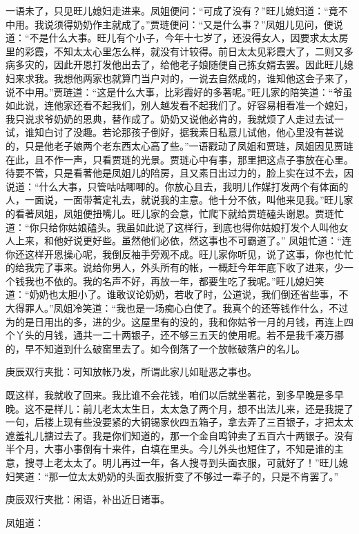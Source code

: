 \begin{parag}


    一语未了，只见旺儿媳妇走进来。凤姐便问：“可成了没有？”旺儿媳妇道：“竟不中用。我说须得奶奶作主就成了。”贾琏便问：“又是什么事？”凤姐儿见问，便说道：“不是什么大事。旺儿有个小子，今年十七岁了，还没得女人，因要求太太房里的彩霞，不知太太心里怎么样，就没有计较得。前日太太见彩霞大了，二则又多病多灾的，因此开恩打发他出去了，给他老子娘随便自己拣女婿去罢。因此旺儿媳妇来求我。我想他两家也就算门当户对的，一说去自然成的，谁知他这会子来了，说不中用。”贾琏道：“这是什么大事，比彩霞好的多著呢。”旺儿家的陪笑道：“爷虽如此说，连他家还看不起我们，别人越发看不起我们了。好容易相看准一个媳妇，我只说求爷奶奶的恩典，替作成了。奶奶又说他必肯的，我就烦了人走过去试一试，谁知白讨了没趣。若论那孩子倒好，据我素日私意儿试他，他心里没有甚说的，只是他老子娘两个老东西太心高了些。”一语戳动了凤姐和贾琏，凤姐因见贾琏在此，且不作一声，只看贾琏的光景。贾琏心中有事，那里把这点子事放在心里。待要不管，只是看著他是凤姐儿的陪房，且又素日出过力的，脸上实在过不去，因说道：“什么大事，只管咕咕唧唧的。你放心且去，我明儿作媒打发两个有体面的人，一面说，一面带著定礼去，就说我的主意。他十分不依，叫他来见我。”旺儿家的看著凤姐，凤姐便扭嘴儿。旺儿家的会意，忙爬下就给贾琏磕头谢恩。贾琏忙道：“你只给你姑娘磕头。我虽如此说了这样行，到底也得你姑娘打发个人叫他女人上来，和他好说更好些。虽然他们必依，然这事也不可霸道了。” 凤姐忙道：“连你还这样开恩操心呢，我倒反袖手旁观不成。旺儿家你听见，说了这事，你也忙忙的给我完了事来。说给你男人，外头所有的帐，一概赶今年年底下收了进来，少一个钱我也不依的。我的名声不好，再放一年，都要生吃了我呢。”旺儿媳妇笑道：“奶奶也太胆小了。谁敢议论奶奶，若收了时，公道说，我们倒还省些事，不大得罪人。”凤姐冷笑道：“我也是一场痴心白使了。我真个的还等钱作什么，不过为的是日用出的多，进的少。这屋里有的没的，我和你姑爷一月的月钱，再连上四个丫头的月钱，通共一二十两银子，还不够三五天的使用呢。若不是我千凑万挪的，早不知道到什么破窑里去了。如今倒落了一个放帐破落户的名儿。\begin{note}庚辰双行夹批：可知放帐乃发，所谓此家儿如耻恶之事也。\end{note}既这样，我就收了回来。我比谁不会花钱，咱们以后就坐著花，到多早晚是多早晚。这不是样儿：前儿老太太生日，太太急了两个月，想不出法儿来，还是我提了一句，后楼上现有些没要紧的大铜锡家伙四五箱子，拿去弄了三百银子，才把太太遮羞礼儿搪过去了。我是你们知道的，那一个金自鸣钟卖了五百六十两银子。没有半个月，大事小事倒有十来件，白填在里头。今儿外头也短住了，不知是谁的主意，搜寻上老太太了。明儿再过一年，各人搜寻到头面衣服，可就好了！”旺儿媳妇笑道：“那一位太太奶奶的头面衣服折变了不够过一辈子的，只是不肯罢了。”\begin{note}庚辰双行夹批：闲语，补出近日诸事。\end{note}凤姐道：
\end{parag}
